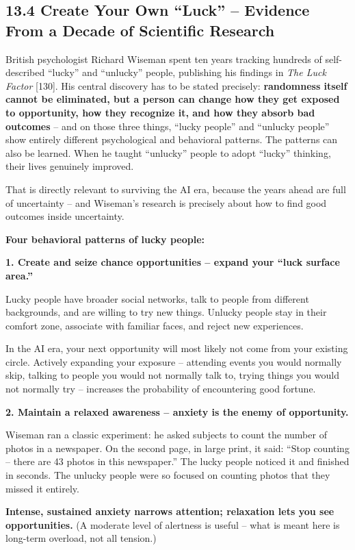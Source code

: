 \documentclass[11pt,a4paper]{article}
\begin{document}
\subsection{13.4 Create Your Own ``Luck'' -- Evidence From a Decade of Scientific Research}

British psychologist Richard Wiseman spent ten years tracking hundreds of self-described ``lucky'' and ``unlucky'' people, publishing his findings in \textit{The Luck Factor}{} [130]. His central discovery has to be stated precisely: \textbf{randomness itself cannot be eliminated, but a person can change how they get exposed to opportunity, how they recognize it, and how they absorb bad outcomes} -- and on those three things, ``lucky people'' and ``unlucky people'' show entirely different psychological and behavioral patterns. The patterns can also be learned. When he taught ``unlucky'' people to adopt ``lucky'' thinking, their lives genuinely improved.

That is directly relevant to surviving the AI era, because the years ahead are full of uncertainty -- and Wiseman's research is precisely about how to find good outcomes inside uncertainty.

\textbf{Four behavioral patterns of lucky people:}

\textbf{1. Create and seize chance opportunities -- expand your ``luck surface area.''}

Lucky people have broader social networks, talk to people from different backgrounds, and are willing to try new things. Unlucky people stay in their comfort zone, associate with familiar faces, and reject new experiences.

In the AI era, your next opportunity will most likely not come from your existing circle. Actively expanding your exposure -- attending events you would normally skip, talking to people you would not normally talk to, trying things you would not normally try -- increases the probability of encountering good fortune.

\textbf{2. Maintain a relaxed awareness -- anxiety is the enemy of opportunity.}

Wiseman ran a classic experiment: he asked subjects to count the number of photos in a newspaper. On the second page, in large print, it said: ``Stop counting -- there are 43 photos in this newspaper.'' The lucky people noticed it and finished in seconds. The unlucky people were so focused on counting photos that they missed it entirely.

\textbf{Intense, sustained anxiety narrows attention; relaxation lets you see opportunities.} (A moderate level of alertness is useful -- what is meant here is long-term overload, not all tension.)
\end{document}
